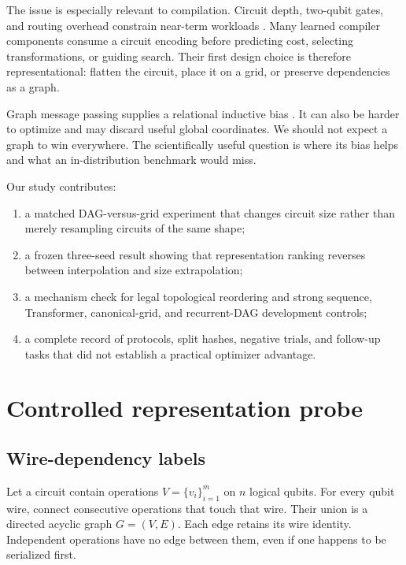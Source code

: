 \documentclass[10pt,twocolumn]{article}
\begin{document}
The issue is especially relevant to compilation. Circuit depth, two-qubit gates, and routing overhead constrain near-term workloads \cite{preskill2018nisq,li2019tackling,cowtan2019qubit}. Many learned compiler components consume a circuit encoding before predicting cost, selecting transformations, or guiding search. Their first design choice is therefore representational: flatten the circuit, place it on a grid, or preserve dependencies as a graph.

Graph message passing supplies a relational inductive bias \cite{gilmer2017mpnn,kipf2017gcn}. It can also be harder to optimize and may discard useful global coordinates. We should not expect a graph to win everywhere. The scientifically useful question is where its bias helps and what an in-distribution benchmark would miss.

Our study contributes:
\begin{enumerate}
    \item a matched DAG-versus-grid experiment that changes circuit size rather than merely resampling circuits of the same shape;
    \item a frozen three-seed result showing that representation ranking reverses between interpolation and size extrapolation;
    \item a mechanism check for legal topological reordering and strong sequence, Transformer, canonical-grid, and recurrent-DAG development controls;
    \item a complete record of protocols, split hashes, negative trials, and follow-up tasks that did not establish a practical optimizer advantage.
\end{enumerate}

\section{Controlled representation probe}

\subsection{Wire-dependency labels}

Let a circuit contain operations $V=\{v_i\}_{i=1}^m$ on $n$ logical qubits. For every qubit wire, connect consecutive operations that touch that wire. Their union is a directed acyclic graph $G=(V,E)$. Each edge retains its wire identity. Independent operations have no edge between them, even if one happens to be serialized first.
\end{document}
